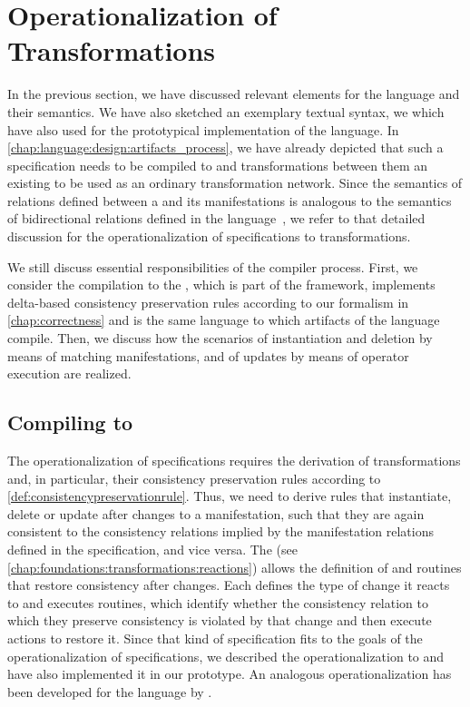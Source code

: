 \section{Operationalization of Transformations}
\label{chap:language:operationalization}

In the previous section, we have discussed relevant elements for the \commonalities language and their semantics.
We have also sketched an exemplary textual syntax, we which have also used for the prototypical implementation of the language.
In \autoref{chap:language:design:artifacts_process}, we have already depicted that such a specification needs to be compiled to \conceptmetamodels and transformations between them an existing \concretemetamodels to be used as an ordinary transformation network.
Since the semantics of relations defined between a \commonality and its manifestations is analogous to the semantics of bidirectional relations defined in the \mappings language~\cite[Chap. 7]{kramer2017a}, we refer to that detailed discussion for the operationalization of \commonalities specifications to transformations.

We still discuss essential responsibilities of the compiler process.
First, we consider the compilation to the \reactionslanguage, which is part of the \vitruv framework, implements delta-based consistency preservation rules according to our formalism in \autoref{chap:correctness} and is the same language to which artifacts of the \mappings language compile.
Then, we discuss how the scenarios of \commonality instantiation and deletion by means of matching manifestations, and of updates by means of operator execution are realized.


\subsection{Compiling to \reactions}

The operationalization of \commonalities specifications requires the derivation of transformations and, in particular, their consistency preservation rules according to \autoref{def:consistencypreservationrule}.
Thus, we need to derive rules that instantiate, delete or update \commonalities after changes to a manifestation, such that they are again consistent to the consistency relations implied by the manifestation relations defined in the \commonalities specification, and vice versa.
The \reactionslanguage (see \autoref{chap:foundations:transformations:reactions}) allows the definition of \reactions and routines that restore consistency after changes.
Each \reaction defines the type of change it reacts to and executes routines, which identify whether the consistency relation to which they preserve consistency is violated by that change and then execute actions to restore it.
Since that kind of specification fits to the goals of the operationalization of \commonalities specifications, we described the operationalization to \reactions and have also implemented it in our prototype.
An analogous operationalization has been developed for the \mapping language by \textcite[Sec. 7.7]{kramer2017a}.

